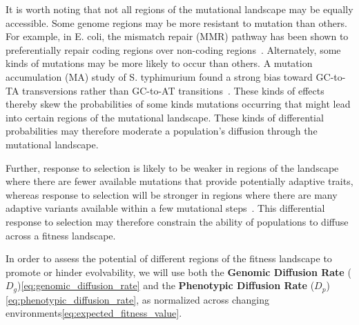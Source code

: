 \documentclass[PhD]{msu-thesis}
\begin{document}
It is worth noting that not all regions of the mutational landscape may be equally accessible. Some genome regions may be more resistant to mutation than others. For example, in E. coli, the mismatch repair (MMR) pathway has been shown to preferentially repair coding regions over non-coding regions~\cite{lee_rate_2012}. Alternately, some kinds of mutations may be more likely to occur than others. A mutation accumulation (MA) study of S. typhimurium found a strong bias toward GC-to-TA transversions rather than GC-to-AT transitions~\cite{lind_whole-genome_2008}. These kinds of effects thereby skew the probabilities of some kinds mutations occurring that might lead into certain regions of the mutational landscape. These kinds of differential probabilities may therefore moderate a population's diffusion through the mutational landscape.
%
%

Further, response to selection is likely to be weaker in regions of the landscape where there are fewer available mutations that provide potentially adaptive traits, whereas response to selection will be stronger in regions where there are many adaptive variants available within a few mutational steps~\cite{alberch_genes_1991,carter_role_2005}. This differential response to selection may therefore constrain the ability of populations to diffuse across a fitness landscape.

In order to assess the potential of different regions of the fitness landscape to promote or hinder evolvability, we will use both the \textbf{Genomic Diffusion Rate} ($D_g$)\ref{eq:genomic_diffusion_rate} and the \textbf{Phenotypic Diffusion Rate} ($D_p$)\ref{eq:phenotypic_diffusion_rate}, as normalized across changing environments\ref{eq:expected_fitness_value}.
\end{document}
